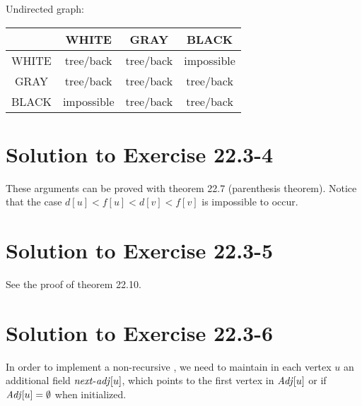 \documentclass[a4paper, fleqn]{article}
\begin{document}
\bigskip
\noindent
Undirected graph:

\begin{center}
\begin{tabular}{|c|c|c|c|}
  \hline
        & WHITE & GRAY & BLACK \\
  \hline
  WHITE & tree/back & tree/back & impossible \\
  \hline
  GRAY  & tree/back & tree/back & tree/back \\
  \hline
  BLACK & impossible & tree/back & tree/back \\
  \hline
\end{tabular}
\end{center}


\section*{Solution to Exercise 22.3-4}

These arguments can be proved with theorem 22.7 (parenthesis theorem). Notice that the case $d[u] < f[u] < d[v] < f[v]$ is impossible to occur.


\section*{Solution to Exercise 22.3-5}

See the proof of theorem 22.10.


\section*{Solution to Exercise 22.3-6}

In order to implement a non-recursive , we need to maintain in each vertex $u$ an additional field $\id{next-adj}[u]$, which points to the first vertex in $\id{Adj}[u]$ or  if $\id{Adj}[u] = \emptyset$ when initialized.
\end{document}
